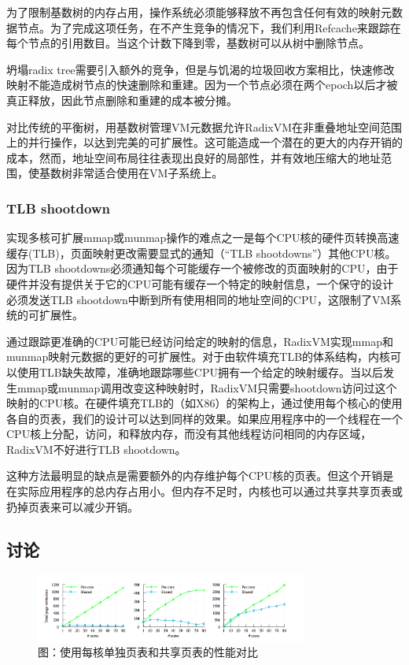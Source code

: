 为了限制基数树的内存占用，操作系统必须能够释放不再包含任何有效的映射元数据节点。为了完成这项任务，在不产生竞争的情况下，我们利用Refcache来跟踪在每个节点的引用数目。当这个计数下降到零，基数树可以从树中删除节点。

坍塌radix
tree需要引入额外的竞争，但是与饥渴的垃圾回收方案相比，快速修改映射不能造成树节点的快速删除和重建。因为一个节点必须在两个epoch以后才被真正释放，因此节点删除和重建的成本被分摊。

对比传统的平衡树，用基数树管理VM元数据允许RadixVM在非重叠地址空间范围上的并行操作，以达到完美的可扩展性。这可能造成一个潜在的更大的内存开销的成本，然而，地址空间布局往往表现出良好的局部性，并有效地压缩大的地址范围，使基数树非常适合使用在VM子系统上。


\subsubsection{TLB shootdown}

实现多核可扩展mmap或munmap操作的难点之一是每个CPU核的硬件页转换高速缓存(TLB)，页面映射更改需要显式的通知（“TLB
shootdowns”）其他CPU核。因为TLB
shootdowns必须通知每个可能缓存一个被修改的页面映射的CPU，由于硬件并没有提供关于它的CPU可能有缓存一个特定的映射信息，一个保守的设计必须发送TLB
shootdown中断到所有使用相同的地址空间的CPU，这限制了VM系统的可扩展性。

通过跟踪更准确的CPU可能已经访问给定的映射的信息，RadixVM实现mmap和munmap映射元数据的更好的可扩展性。对于由软件填充TLB的体系结构，内核可以使用TLB缺失故障，准确地跟踪哪些CPU拥有一个给定的映射缓存。当以后发生mmap或munmap调用改变这种映射时，RadixVM只需要shootdown访问过这个映射的CPU核。在硬件填充TLB的（如X86）的架构上，通过使用每个核心的使用各自的页表，我们的设计可以达到同样的效果。如果应用程序中的一个线程在一个CPU核上分配，访问，和释放内存，而没有其他线程访问相同的内存区域，RadixVM不好进行TLB shootdown。


这种方法最明显的缺点是需要额外的内存维护每个CPU核的页表。但这个开销是在实际应用程序的总内存占用小。但内存不足时，内核也可以通过共享共享页表或扔掉页表来可以减少开销。


\subsection{讨论}

\begin{figure}[ht]
  \centering
  \includegraphics[width=0.8\textwidth]{figures/appedix_pagetable.png} 
  \caption*{图：使用每核单独页表和共享页表的性能对比}
\end{figure}


